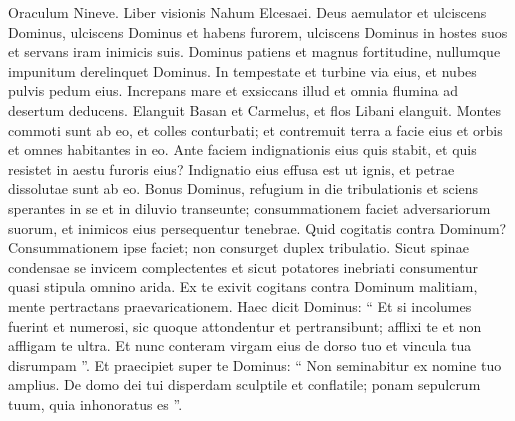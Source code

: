 \begin{biblechapter}
 \verse Oraculum Nineve. Liber visionis Nahum Elcesaei.
 \verse Deus aemulator et ulciscens Dominus,
 ulciscens Dominus et habens furorem,
 ulciscens Dominus in hostes suos
 et servans iram inimicis suis.
 \verse Dominus patiens et magnus fortitudine,
 nullumque impunitum derelinquet Dominus.
 In tempestate et turbine via eius,
 et nubes pulvis pedum eius.
 \verse Increpans mare et exsiccans illud
 et omnia flumina ad desertum deducens.
 Elanguit Basan et Carmelus,
 et flos Libani elanguit.
 \verse Montes commoti sunt ab eo,
 et colles conturbati;
 et contremuit terra a facie eius
 et orbis et omnes habitantes in eo.
 \verse Ante faciem indignationis eius quis stabit,
 et quis resistet in aestu furoris eius? Indignatio eius effusa est ut ignis,
 et petrae dissolutae sunt ab eo.
 \verse Bonus Dominus,
 refugium in die tribulationis
 et sciens sperantes in se
 \verse et in diluvio transeunte;
 consummationem faciet adversariorum suorum,
 et inimicos eius persequentur tenebrae.
 \verse Quid cogitatis contra Dominum?
 Consummationem ipse faciet;
 non consurget duplex tribulatio.
 \verse Sicut spinae condensae se invicem complectentes
 et sicut potatores inebriati
 consumentur quasi stipula omnino arida.
 \verse Ex te exivit cogitans contra Dominum malitiam,
 mente pertractans praevaricationem.
 \verse Haec dicit Dominus:
 “ Et si incolumes fuerint et numerosi,
 sic quoque attondentur et pertransibunt;
 afflixi te et non affligam te ultra.
 \verse Et nunc conteram virgam eius de dorso tuo
 et vincula tua disrumpam ”.
 \verse Et praecipiet super te Dominus:
 “ Non seminabitur ex nomine tuo amplius.
 De domo dei tui disperdam sculptile et conflatile;
 ponam sepulcrum tuum,
 quia inhonoratus es ”.
 

\end{biblechapter}
